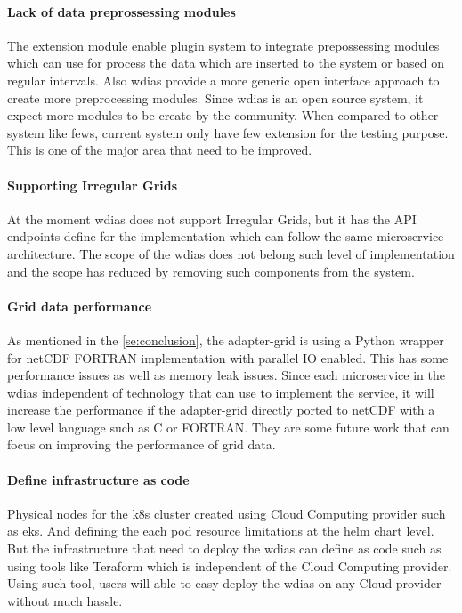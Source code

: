 \documentclass[conference]{IEEEtran}
\begin{document}
\paragraph{Lack of data preprossessing modules}
The extension module enable plugin system to integrate prepossessing modules which can use for process the data which are inserted to the system or based on regular intervals. Also \acrshort{wdias} provide a more generic open interface approach to create more preprocessing modules. Since \acrshort{wdias} is an open source system, it expect more modules to be create by the community. When compared to other system like \acrshort{fews}, current system only have few extension for the testing purpose. This is one of the major area that need to be improved.

\paragraph{Supporting Irregular Grids}
At the moment \acrshort{wdias} does not support Irregular Grids, but it has the API endpoints define for the implementation which can follow the same microservice architecture. The scope of the \acrshort{wdias} does not belong such level of implementation and the scope has reduced by removing such components from the system.

\paragraph{Grid data performance}
As mentioned in the \ref{se:conclusion}, the adapter-grid is using a Python wrapper for netCDF FORTRAN implementation with parallel IO enabled. This has some performance issues as well as memory leak issues. Since each microservice in the \acrshort{wdias} independent of technology that can use to implement the service, it will increase the performance if the adapter-grid directly ported to netCDF with a low level language such as C or FORTRAN. They are some future work that can focus on improving the performance of grid data.

\paragraph{Define infrastructure as code}
Physical nodes for the \acrshort{k8s} cluster created using Cloud Computing provider such as \acrshort{eks}. And defining the each pod resource limitations at the helm chart level. But the infrastructure that need to deploy the \acrshort{wdias} can define as code such as using tools like Teraform which is independent of the Cloud Computing provider. Using such tool, users will able to easy deploy the \acrshort{wdias} on any Cloud provider without much hassle.
\end{document}
